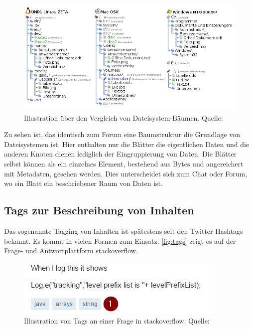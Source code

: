 \documentclass[a4paper]{article}
\begin{document}
	\begin{figure}[H] 
		\includegraphics[width=\linewidth]{../Bilder/filesystem.png}
		\caption{
			Illustration über den Vergleich von Dateisystem-Bäumen.
			Quelle: \cite{filesytsem}
		}
		\label{fig:filesytsem}
	\end{figure}
	
	\newpage
	Zu sehen ist, das identisch zum Forum eine Baumstruktur die Grundlage von
	Dateisystemen ist. Hier enthalten nur die Blätter die eigentlichen Daten und die
	anderen Knoten dienen lediglich der Eingruppierung von Daten. Die Blätter selbst
	können als ein einzelnes Element, bestehend aus Bytes und angereichert mit
	Metadaten, gesehen werden. Dies unterscheidet sich zum Chat oder Forum, wo ein
	Blatt ein beschriebener Raum von Daten ist. 
	
	\subsection{Tags zur Beschreibung von Inhalten}
	\label{sec:tags}
	
	Das sogenannte Tagging von Inhalten ist spätestens seit den Twitter Hashtags
	bekannt. Es kommt in vielen Formen zum Einsatz. \autoref{fig:tags} zeigt es
	auf der Frage- und Antwortplattform stackoverflow.
	
	\begin{figure}[H] 
		\centerline{
			\includegraphics[scale=0.95]{../Bilder/tags.jpg}
		}
		\caption{
			Illustration von Tags an einer Frage in stackoverflow.
			Quelle: \cite{stackoverflow}
		}
		\label{fig:tags}
	\end{figure}
	
\end{document}
